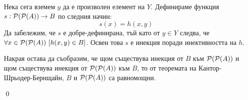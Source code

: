 \quad
Нека сега вземем $y$ да е произволен елемент на $Y$. Дефинираме функция $s: \mathcal{P}(\mathcal{P}(A)) \to B$ по следния начин:
\[
s(x) = h(x, y)
\]
\quad
Да забележим, че $s$ е добре-дефинирана, тъй като от $y \in Y$ следва, че $\forall x \in \mathcal{P}(\mathcal{P}(A))\ [h(x, y) \in B]$.
Освен това $s$ е инекция поради инективността на $h$.

\smallbreak
\quad
Накрая остава да съобразим, че щом съществува инекция от $B$ към $\mathcal{P}(\mathcal{P}(A))$ и щом съществува инекция от $\mathcal{P}(\mathcal{P}(A))$ към $B$,
то от теоремата на Кантор-Шрьодер-Бернщайн, $B$ и $\mathcal{P}(\mathcal{P}(A))$ са равномощни.

\qed
